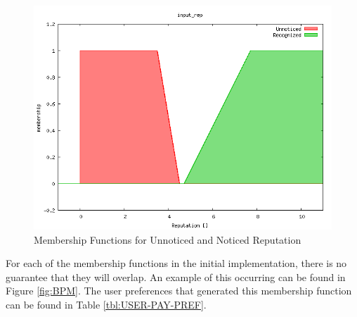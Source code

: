\documentclass[12pt,fleqn,reqno,letterpaper]{article}
\begin{document}
\begin{figure}[H]
  \centering
  \includegraphics[scale=0.5,natwidth=640,natheight=480]{fig/baseline_input_rep.png}
  \caption{Membership Functions for Unnoticed and Noticed Reputation}
  \label{fig:BRM}
\end{figure}

For each of the membership functions in the initial implementation, there is no guarantee that they will overlap. An example of this occurring can be found in Figure \ref{fig:BPM}. The user preferences that generated this membership function can be found in Table \ref{tbl:USER-PAY-PREF}.
\end{document}
